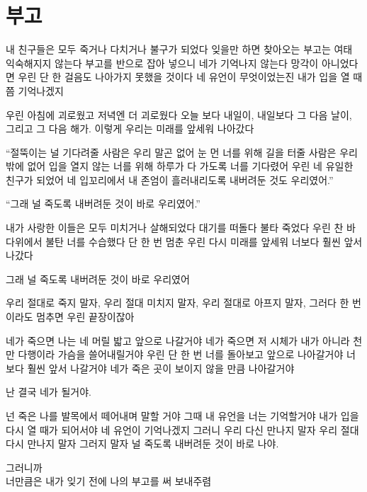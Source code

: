 \hypertarget{uxbd80uxace0}{%

\chapter{부고}\label{uxbd80uxace0}}



내 친구들은 모두 죽거나 다치거나 불구가 되었다 잊을만 하면 찾아오는 부고는 여태 익숙해지지 않는다 부고를 반으로 잡아 넣으니 네가 기억나지 않는다 망각이 아니었다면 우린 단 한 걸음도 나아가지 못했을 것이다 네 유언이 무엇이었는진 내가 입을 열 때 쯤 기억나겠지



우린 아침에 괴로웠고 저녁엔 더 괴로웠다 오늘 보다 내일이, 내일보다 그 다음 날이, 그리고 그 다음 해가. 이렇게 우리는 미래를 앞세워 나아갔다



``절뚝이는 널 기다려줄 사람은 우리 말곤 없어 눈 먼 너를 위해 길을 터줄 사람은 우리 밖에 없어 입을 열지 않는 너를 위해 하루가 다 가도록 너를 기다렸어 우린 네 유일한 친구가 되었어 네 입꼬리에서 내 존엄이 흘러내리도록 내버려둔 것도 우리였어.''



``그래 널 죽도록 내버려둔 것이 바로 우리였어.''



내가 사랑한 이들은 모두 미치거나 살해되었다 대기를 떠돌다 불타 죽었다 우린 찬 바다위에서 불탄 너를 수습했다 단 한 번 멈춘 우린 다시 미래를 앞세워 너보다 훨씬 앞서 나갔다



그래 널 죽도록 내버려둔 것이 바로 우리였어



우리 절대로 죽지 말자, 우리 절대 미치지 말자, 우리 절대로 아프지 말자, 그러다 한 번이라도 멈추면 우린 끝장이잖아



네가 죽으면 나는 네 머릴 밟고 앞으로 나갈거야 네가 죽으면 저 시체가 내가 아니라 천만 다행이라 가슴을 쓸어내릴거야 우린 단 한 번 너를 돌아보고 앞으로 나아갈거야 너보다 훨씬 앞서 나갈거야 네가 죽은 곳이 보이지 않을 만큼 나아갈거야



난 결국 네가 될거야.



넌 죽은 나를 발목에서 떼어내며 말할 거야 그때 내 유언을 너는 기억할거야 내가 입을 다시 열 때가 되어서야 네 유언이 기억나겠지 그러니 우리 다신 만나지 말자 우리 절대 다시 만나지 말자 그러지 말자 널 죽도록 내버려둔 것이 바로 나야.



그러니까\\

너만큼은 내가 잊기 전에 나의 부고를 써 보내주렴 ​

